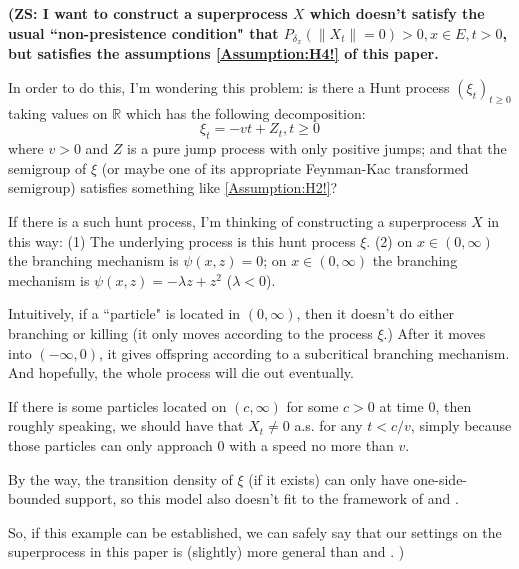 \documentclass[12pt,a4paper]{amsart}
\numberwithin{equation}{section}
\theoremstyle{plain}
\theoremstyle{definition}
\theoremstyle{remark}
\newcounter{N}
\newcounter{n}[N]
\begin{document}
{\bf (ZS: I want to construct a superprocess $X$ which doesn't satisfy the usual ``non-presistence condition" that $P_{\delta_x}(\|X_t\| = 0)>0, x\in E, t>0$, but satisfies the assumptions \ref{Assumption:H4!} of this paper.
	
	In order to do this, I'm wondering this problem: is there a Hunt process $(\xi_t)_{t\geq 0}$ taking values on $\mathbb R$ which has the following decomposition:
	\[\xi_t = - vt + Z_t,t\geq 0\]
	 where $v>0$ and $Z$ is a pure jump process with only positive jumps; and that the semigroup of $\xi$ (or maybe one of its appropriate Feynman-Kac transformed semigroup) satisfies something like \ref{Assumption:H2!}?
	
	 If there is a such hunt process, I'm thinking of constructing a superprocess $X$ in this way:
	 (1) The underlying process is this hunt process $\xi$.
	 (2) on $x\in (0,\infty)$ the branching mechanism is $\psi(x,z) = 0$; on $x\in (0,\infty)$ the branching mechanism is $\psi(x,z) = - \lambda z + z^2$ ($\lambda < 0$).
	
	 Intuitively, if a ``particle" is located in $(0,\infty)$, then it doesn't do either branching or killing (it only moves according to the process $\xi$.) After it moves into $(-\infty, 0)$, it gives offspring according to a subcritical branching mechanism.
	 And hopefully, the whole process will die out eventually.
	
	 If there is some particles located on $(c, \infty)$ for some $c>0$ at time $0$, then roughly speaking, we should have that $X_t \neq 0$ a.s. for any $t<c/v$, simply because those particles can only approach $0$ with a speed no more than $v$.
	
	 By the way, the transition density of $\xi$ (if it exists) can only have one-side-bounded support, so this model also doesn't fit to the framework of \cite{RenSongZhang2015Limit} and \cite{RenSongZhang2017Central}.
	
	 So, if this example can be established, we can safely say that our settings on the superprocess in this paper is (slightly) more general than \cite{RenSongZhang2015Limit} and \cite{RenSongZhang2017Central}.
	 )}
\end{document}
